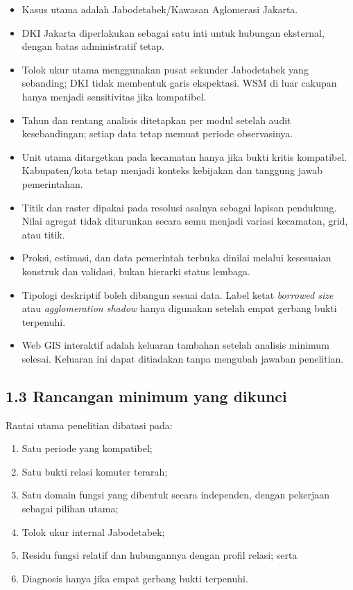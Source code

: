 \documentclass[
  indonesian,
  11pt,
]{article}
\providecommand{\tightlist}{%
  \setlength{\itemsep}{0pt}\setlength{\parskip}{0pt}}
\renewcommand{\tightlist}{%
  \setlength{\itemsep}{0.22em}%
  \setlength{\parskip}{0pt}%
}
\begin{document}
\begin{itemize}
\tightlist
\item
  Kasus utama adalah Jabodetabek/Kawasan Aglomerasi Jakarta.
\item
  DKI Jakarta diperlakukan sebagai satu inti untuk hubungan eksternal,
  dengan batas administratif tetap.
\item
  Tolok ukur utama menggunakan pusat sekunder Jabodetabek yang
  sebanding; DKI tidak membentuk garis ekspektasi. WSM di luar cakupan
  hanya menjadi sensitivitas jika kompatibel.
\item
  Tahun dan rentang analisis ditetapkan per modul setelah audit
  kesebandingan; setiap data tetap memuat periode observasinya.
\item
  Unit utama ditargetkan pada kecamatan hanya jika bukti kritis
  kompatibel. Kabupaten/kota tetap menjadi konteks kebijakan dan
  tanggung jawab pemerintahan.
\item
  Titik dan raster dipakai pada resolusi asalnya sebagai lapisan
  pendukung. Nilai agregat tidak diturunkan secara semu menjadi variasi
  kecamatan, grid, atau titik.
\item
  Proksi, estimasi, dan data pemerintah terbuka dinilai melalui
  kesesuaian konstruk dan validasi, bukan hierarki status lembaga.
\item
  Tipologi deskriptif boleh dibangun sesuai data. Label ketat
  \emph{borrowed size} atau \emph{agglomeration shadow} hanya digunakan
  setelah empat gerbang bukti terpenuhi.
\item
  Web GIS interaktif adalah keluaran tambahan setelah analisis minimum
  selesai. Keluaran ini dapat ditiadakan tanpa mengubah jawaban
  penelitian.
\end{itemize}

\subsection{1.3 Rancangan minimum yang
dikunci}\label{rancangan-minimum-yang-dikunci}

Rantai utama penelitian dibatasi pada:

\begin{enumerate}
\def\labelenumi{\arabic{enumi}.}
\tightlist
\item
  Satu periode yang kompatibel;
\item
  Satu bukti relasi komuter terarah;
\item
  Satu domain fungsi yang dibentuk secara independen, dengan pekerjaan
  sebagai pilihan utama;
\item
  Tolok ukur internal Jabodetabek;
\item
  Residu fungsi relatif dan hubungannya dengan profil relasi; serta
\item
  Diagnosis hanya jika empat gerbang bukti terpenuhi.
\end{enumerate}
\end{document}
